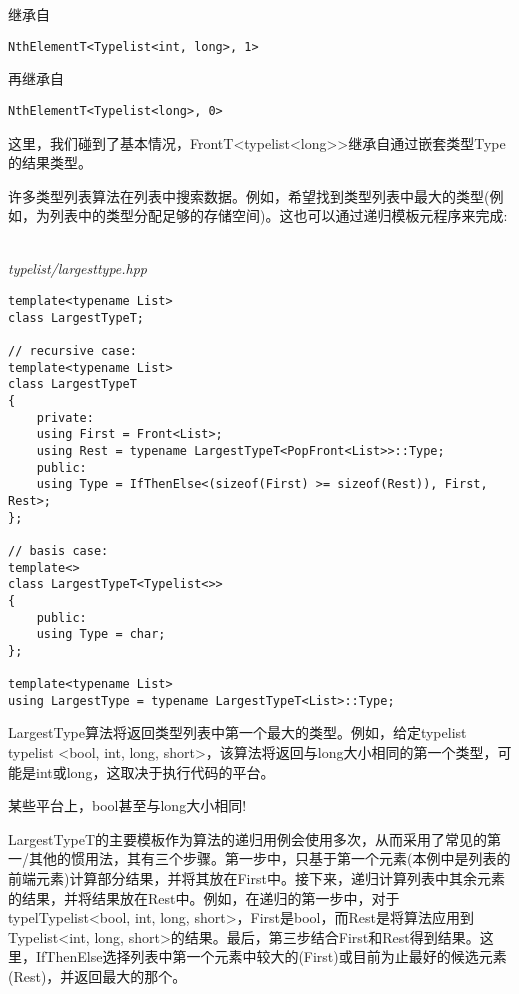 继承自

\begin{lstlisting}[style=styleCXX]
NthElementT<Typelist<int, long>, 1>
\end{lstlisting}

再继承自

\begin{lstlisting}[style=styleCXX]
NthElementT<Typelist<long>, 0>
\end{lstlisting}

这里，我们碰到了基本情况，FrontT<typelist<long>>继承自通过嵌套类型Type的结果类型。


许多类型列表算法在列表中搜索数据。例如，希望找到类型列表中最大的类型(例如，为列表中的类型分配足够的存储空间)。这也可以通过递归模板元程序来完成:

\hspace*{\fill} \\ %
\noindent
\textit{typelist/largesttype.hpp}
\begin{lstlisting}[style=styleCXX]
template<typename List>
class LargestTypeT;

// recursive case:
template<typename List>
class LargestTypeT
{
	private:
	using First = Front<List>;
	using Rest = typename LargestTypeT<PopFront<List>>::Type;
	public:
	using Type = IfThenElse<(sizeof(First) >= sizeof(Rest)), First, Rest>;
};

// basis case:
template<>
class LargestTypeT<Typelist<>>
{
	public:
	using Type = char;
};

template<typename List>
using LargestType = typename LargestTypeT<List>::Type;
\end{lstlisting}

LargestType算法将返回类型列表中第一个最大的类型。例如，给定typelist typelist <bool, int, long, short>，该算法将返回与long大小相同的第一个类型，可能是int或long，这取决于执行代码的平台。

\begin{tcolorbox}[colback=webgreen!5!white,colframe=webgreen!75!black]
\hspace*{0.75cm}某些平台上，bool甚至与long大小相同!
\end{tcolorbox}

LargestTypeT的主要模板作为算法的递归用例会使用多次，从而采用了常见的第一/其他的惯用法，其有三个步骤。第一步中，只基于第一个元素(本例中是列表的前端元素)计算部分结果，并将其放在First中。接下来，递归计算列表中其余元素的结果，并将结果放在Rest中。例如，在递归的第一步中，对于typelTypelist<bool, int, long, short>，First是bool，而Rest是将算法应用到Typelist<int, long, short>的结果。最后，第三步结合First和Rest得到结果。这里，IfThenElse选择列表中第一个元素中较大的(First)或目前为止最好的候选元素(Rest)，并返回最大的那个。

